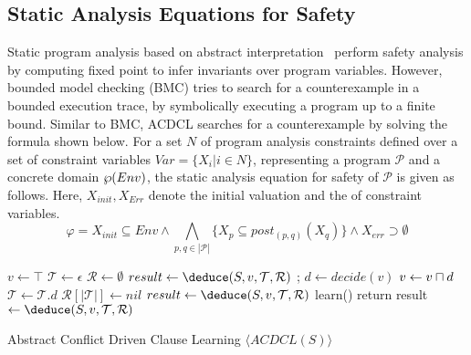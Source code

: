 \subsection{Static Analysis Equations for Safety}
Static program analysis based on abstract interpretation~\cite{DBLP:conf/emsoft/Cousot07} 
perform safety analysis by computing fixed point to infer invariants 
over program variables.  However, bounded model checking (BMC) tries to search 
for a counterexample in a bounded execution trace, by symbolically executing a 
program up to a finite bound.  
Similar to BMC, ACDCL searches for a counterexample by solving the formula shown below.
For a set $N$ of program analysis constraints defined over a set 
of constraint variables $Var = \{X_i| i \in N\}$, representing a program
$\mathcal{P}$ and a concrete domain $\wp(Env)$, the static analysis equation 
for safety of $\mathcal{P}$ is given as follows.  Here, $X_{init}, X_{Err}$ denote the initial valuation 
and the  of constraint variables.
\[\varphi = X_{init} \subseteq Env \wedge \underset{p,q \in |\mathcal{P}|}
{\bigwedge} \{ X_p \subseteq post_{(p,q)}(X_q) \} \wedge X_{err} \supset \emptyset \] 
%
\begin{algorithm2e}[t]
\DontPrintSemicolon
{}
\begin{small}
$v \leftarrow \top$ \;
$\mathcal{T} \leftarrow \epsilon$ \;
$\mathcal{R} \leftarrow \emptyset$ \;
$result \leftarrow \deduce(S,v,\mathcal{T},\mathcal{R})$ \;
 {
  \return \safe \;
}
{
   {
    \return \unsafe;
  }
  $d \leftarrow decide(v)$ \;
  $v \leftarrow v \sqcap d$ \; 
  $\mathcal{T} \leftarrow \mathcal{T} . d$ \; 
  $\mathcal{R}[|\mathcal{T}|] \leftarrow nil$ \;
  $result \leftarrow \deduce(S,v,\mathcal{T},\mathcal{R})$\;
   {
    learn() \;
     {
      return \safe \;  
    }
    result $\leftarrow \deduce(S,v,\mathcal{T},\mathcal{R})$ \;
  }
}
\end{small}
\caption{Abstract Conflict Driven Clause Learning $\langle ACDCL(S) \rangle$ \label{Alg:acdcl}}
\end{algorithm2e}
%
